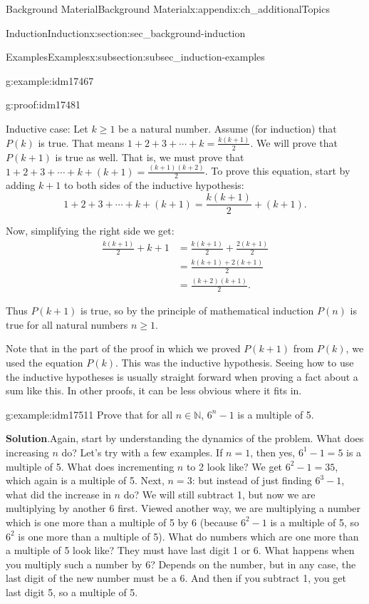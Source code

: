 \documentclass[oneside,10pt,]{book}
\numberwithin{equation}{chapter}
\def\N{\mathbb N}
\newcommand{\amp}{&}
\begin{document}
\begin{appendixptx}{Background Material}{}{Background Material}{}{}{x:appendix:ch_additionalTopics}
\begin{sectionptx}{Induction}{}{Induction}{}{}{x:section:sec_background-induction}
\begin{subsectionptx}{Examples}{}{Examples}{}{}{x:subsection:subsec_induction-examples}
\begin{example}{}{g:example:idm17467}
\begin{proofptx}{}{g:proof:idm17481}
\par
Inductive case: Let \(k \ge 1\) be a natural number. Assume (for induction) that \(P(k)\) is true. That means \(1 + 2 + 3 + \cdots + k = \frac{k(k+1)}{2}\). We will prove that \(P(k+1)\) is true as well. That is, we must prove that \(1 + 2 + 3 + \cdots + k + (k+1) = \frac{(k+1)(k+2)}{2}\). To prove this equation, start by adding \(k+1\) to both sides of the inductive hypothesis:%
\begin{equation*}
1 + 2 + 3 + \cdots + k + (k+1) = \frac{k(k+1)}{2} + (k+1).
\end{equation*}
%
\par
Now, simplifying the right side we get:%
\begin{align*}
\frac{k(k+1)}{2} + k+1 \amp = \frac{k(k+1)}{2} + \frac{2(k+1)}{2}\\
\amp = \frac{k(k+1) + 2(k+1)}{2}\\
\amp = \frac{(k+2)(k+1)}{2}.
\end{align*}
%
\par
Thus \(P(k+1)\) is true, so by the principle of mathematical induction \(P(n)\) is true for all natural numbers \(n \ge 1\).%
\end{proofptx}
\end{example}
Note that in the part of the proof in which we proved \(P(k+1)\) from \(P(k)\), we used the equation \(P(k)\). This was the inductive hypothesis. Seeing how to use the inductive hypotheses is usually straight forward when proving a fact about a sum like this. In other proofs, it can be less obvious where it fits in.%
\begin{example}{}{g:example:idm17511}%
Prove that for all \(n \in \N\), \(6^n - 1\) is a multiple of 5.%
\par\smallskip%
\noindent\textbf{Solution}.\hypertarget{g:solution:idm17516}{}\quad{}Again, start by understanding the dynamics of the problem. What does increasing \(n\) do? Let's try with a few examples. If \(n = 1\), then yes, \(6^1 - 1 = 5\) is a multiple of 5. What does incrementing \(n\) to 2 look like? We get \(6^2 - 1 = 35\), which again is a multiple of 5. Next, \(n = 3\): but instead of just finding \(6^3 - 1\), what did the increase in \(n\) do? We will still subtract 1, but now we are multiplying by another 6 first. Viewed another way, we are multiplying a number which is one more than a multiple of 5 by 6 (because \(6^2 - 1\) is a multiple of 5, so \(6^2\) is one more than a multiple of 5). What do numbers which are one more than a multiple of 5 look like? They must have last digit 1 or 6. What happens when you multiply such a number by 6? Depends on the number, but in any case, the last digit of the new number must be a 6. And then if you subtract 1, you get last digit 5, so a multiple of 5.%

\end{example}
\end{subsectionptx}
\end{sectionptx}
\end{appendixptx}
\end{document}
